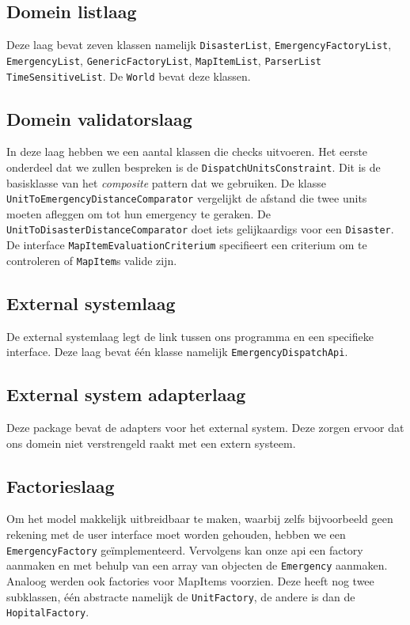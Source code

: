 \subsection{Domein listlaag}
Deze laag bevat zeven klassen namelijk \texttt{Disaster\-List}, \texttt{Emergency\-Factory\-List}, \texttt{Emergency\-List}, \texttt{Generic\-Factory\-List}, \texttt{Map\-Item\-List}, \texttt{Parser\-List} \texttt{Time\-Sensitive\-List}. De \texttt{World} bevat deze klassen.

\subsection{Domein validatorslaag}
In deze laag hebben we een aantal klassen die checks uitvoeren. Het eerste onderdeel dat we zullen bespreken is de \texttt{DispatchUnitsConstraint}. Dit is de basisklasse van het \textit{composite} pattern dat we gebruiken. De klasse \texttt{UnitToEmergencyDistanceComparator} vergelijkt de afstand die twee units moeten afleggen om tot hun emergency te geraken. De \texttt{UnitToDisasterDistanceComparator} doet iets gelijkaardigs voor een \texttt{Disaster}. De interface \texttt{MapItemEvaluationCriterium} specifieert een criterium om te controleren of \texttt{MapItem}s valide zijn.

\subsection{External systemlaag}
De external systemlaag legt de link tussen ons programma en een specifieke interface. Deze laag bevat \'e\'en klasse namelijk \texttt{EmergencyDispatchApi}.

\subsection{External system adapterlaag}
Deze package bevat de adapters voor het external system. Deze zorgen ervoor dat ons domein niet verstrengeld raakt met een extern systeem.

\subsection{Factorieslaag}
Om het model makkelijk uitbreidbaar te maken, waarbij zelfs bijvoorbeeld geen rekening met de user interface moet worden gehouden, hebben we een \texttt{EmergencyFactory} ge\"implementeerd. Vervolgens kan onze api een factory aanmaken en met behulp van een array van objecten de \texttt{Emergency} aanmaken. Analoog werden ook factories voor MapItems voorzien. Deze heeft nog twee subklassen, \'e\'en abstracte namelijk de \texttt{UnitFactory}, de andere is dan de \texttt{HopitalFactory}.

